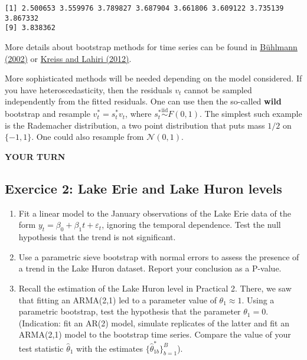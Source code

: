 \documentclass[]{book}
\providecommand{\tightlist}{%
  \setlength{\itemsep}{0pt}\setlength{\parskip}{0pt}}
\begin{document}
\begin{verbatim}
[1] 2.500653 3.559976 3.789827 3.687904 3.661806 3.609122 3.735139 3.867332
[9] 3.838362
\end{verbatim}

More details about bootstrap methods for time series can be found in
\href{https://projecteuclid.org/euclid.ss/1023798998}{Bühlmann (2002)}
or
\href{https://www.kevinsheppard.com/images/0/0a/Kreiss_and_lahiri.pdf}{Kreiss
and Lahiri (2012)}.

More sophisticated methods will be needed depending on the model
considered. If you have heteroscedasticity, then the residuals \(v_t\)
cannot be sampled independently from the fitted residuals. One can use
then the so-called \textbf{wild} bootstrap and resample
\(v_t^*=s_t^*v_t\), where \(s_t^* \stackrel{\mathrm{iid}}{\sim}F(0,1)\).
The simplest such example is the Rademacher distribution, a two point
distribution that puts mass \(1/2\) on \(\{-1, 1\}\). One could also
resample from \(\mathcal{N}(0,1)\).

\textbf{YOUR TURN}

\subsection{Exercice 2: Lake Erie and Lake Huron
levels}\label{exercice-2-lake-erie-and-lake-huron-levels}

\begin{enumerate}
\def\labelenumi{\arabic{enumi}.}
\tightlist
\item
  Fit a linear model to the January observations of the Lake Erie data
  of the form \(y_t=\beta_0+\beta_1t+\varepsilon_t\), ignoring the
  temporal dependence. Test the null hypothesis that the trend is not
  significant.
\item
  Use a parametric sieve bootstrap with normal errors to assess the
  presence of a trend in the Lake Huron dataset. Report your conclusion
  as a P-value.
\item
  Recall the estimation of the Lake Huron level in Practical 2. There,
  we saw that fitting an ARMA(2,1) led to a parameter value of
  \(\theta_1 \approx 1\). Using a parametric bootstrap, test the
  hypothesis that the parameter \(\theta_1=0\). (Indication: fit an
  AR(2) model, simulate replicates of the latter and fit an ARMA(2,1)
  model to the bootstrap time series. Compare the value of your test
  statistic \(\hat{\theta}_1\) with the estimates
  \(\{\hat{\theta}_{1b}^{*}\}_{b=1}^B\)).
\end{enumerate}
\end{document}
